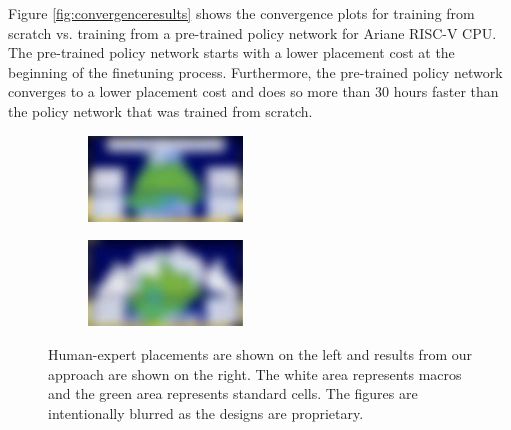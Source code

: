\documentclass{article}
\begin{document}
Figure \ref{fig:convergenceresults} shows the convergence plots for training from scratch vs. training from a pre-trained policy network for Ariane RISC-V CPU. The pre-trained policy network starts with a lower placement cost at the beginning of the finetuning process. Furthermore, the pre-trained policy network converges to a lower placement cost and does so more than 30 hours faster than the policy network that was trained from scratch.





\begin{figure}[t]
    \centering
    \begin{subfigure}
        \centering
        \includegraphics[width=0.45\textwidth]{human_old_cropped-c.pdf}
    \end{subfigure}
    \begin{subfigure}
        \centering
         \includegraphics[width=0.45\textwidth]{morpheus_old_cropped-c.pdf} 
    \end{subfigure}
    \caption{Human-expert placements are shown on the left and results from our approach are shown on the right. The white area represents macros and the green area represents standard cells. The figures are intentionally blurred as the designs are proprietary.}
    \label{fig:visualization-plc}
\end{figure}
\end{document}
